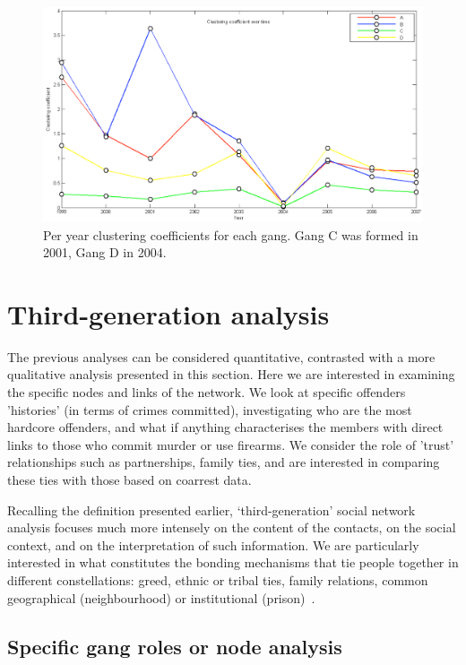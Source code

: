 \documentclass[twocolumn]{svjour3}          %
\theoremstyle{definition}
\begin{document}
\begin{figure}[htb]
\centering
\includegraphics[width=\columnwidth]{images/gangscc1years}
\caption{Per year clustering coefficients for each gang. Gang C was formed in 2001, Gang D in 2004.} 
\label{fig:gangscc1years}
\end{figure}



\section{Third-generation analysis}\label{sec:thirdanalysis}

The previous analyses can be considered quantitative, contrasted with
a more qualitative analysis presented in this section. Here we are
interested in examining the specific nodes and links of the
network. We look at specific offenders 'histories' (in terms of crimes
committed), investigating who are the most hardcore offenders, and
what if anything characterises the members with direct links to those
who commit murder or use firearms. We consider the role of 'trust'
relationships such as partnerships, family ties, and are interested in
comparing these ties with those based on coarrest data.

Recalling the definition presented earlier, `third-generation' social
network analysis focuses much more intensely on the content of the
contacts, on the social context, and on the interpretation of such
information. We are particularly interested in what constitutes the
bonding mechanisms that tie people together in different
constellations: greed, ethnic or tribal ties, family relations, common
geographical (neighbourhood) or institutional
(prison)~\citep{Klerks2001}.


\subsection{Specific gang roles or node analysis}\label{sec:shortestpaths}
\end{document}
